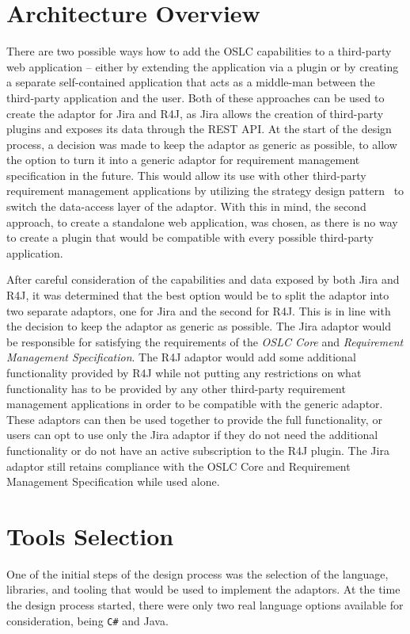 \section{Architecture Overview}
There are two possible ways how to add the OSLC capabilities to a third-party web application -- either by extending the application via a plugin or by creating a separate self-contained application that acts as a middle-man between the third-party application and the user. Both of these approaches can be used to create the adaptor for Jira and R4J, as Jira allows the creation of third-party plugins and exposes its data through the REST API. At the start of the design process, a decision was made to keep the adaptor as generic as possible, to allow the option to turn it into a generic adaptor for requirement management specification in the future. This would allow its use with other third-party requirement management applications by utilizing the strategy design pattern \cite{strategy_design_pattern} to switch the data-access layer of the adaptor. With this in mind, the second approach, to create a standalone web application, was chosen, as there is no way to create a plugin that would be compatible with every possible third-party application.

After careful consideration of the capabilities and data exposed by both Jira and R4J, it was determined that the best option would be to split the adaptor into two separate adaptors, one for Jira and the second for R4J. This is in line with the decision to keep the adaptor as generic as possible. The Jira adaptor would be responsible for satisfying the requirements of the \emph{OSLC Core} and \emph{Requirement Management Specification}. The R4J adaptor would add some additional functionality provided by R4J while not putting any restrictions on what functionality has to be provided by any other third-party requirement management applications in order to be compatible with the generic adaptor. These adaptors can then be used together to provide the full functionality, or users can opt to use only the Jira adaptor if they do not need the additional functionality or do not have an active subscription to the R4J plugin. The Jira adaptor still retains compliance with the OSLC Core and Requirement Management Specification while used alone.

\section{Tools Selection}
One of the initial steps of the design process was the selection of the language, libraries, and tooling that would be used to implement the adaptors. At the time the design process started, there were only two real language options available for consideration, being \texttt{C\#} and Java.

